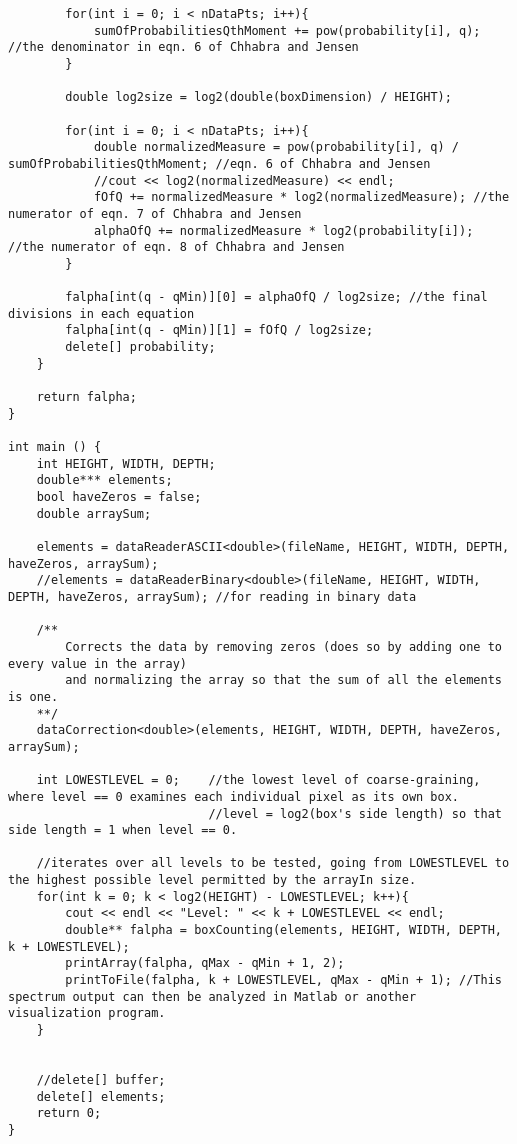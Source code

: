 \begin{lstlisting}
		for(int i = 0; i < nDataPts; i++){
			sumOfProbabilitiesQthMoment += pow(probability[i], q); //the denominator in eqn. 6 of Chhabra and Jensen
		}

		double log2size = log2(double(boxDimension) / HEIGHT);

		for(int i = 0; i < nDataPts; i++){
			double normalizedMeasure = pow(probability[i], q) / sumOfProbabilitiesQthMoment; //eqn. 6 of Chhabra and Jensen
			//cout << log2(normalizedMeasure) << endl;
			fOfQ += normalizedMeasure * log2(normalizedMeasure); //the numerator of eqn. 7 of Chhabra and Jensen
			alphaOfQ += normalizedMeasure * log2(probability[i]); //the numerator of eqn. 8 of Chhabra and Jensen
		}

		falpha[int(q - qMin)][0] = alphaOfQ / log2size; //the final divisions in each equation
		falpha[int(q - qMin)][1] = fOfQ / log2size;
		delete[] probability;
	}

	return falpha;
}

int main () {
    int HEIGHT, WIDTH, DEPTH;
    double*** elements;
    bool haveZeros = false;
    double arraySum;

    elements = dataReaderASCII<double>(fileName, HEIGHT, WIDTH, DEPTH, haveZeros, arraySum); 
    //elements = dataReaderBinary<double>(fileName, HEIGHT, WIDTH, DEPTH, haveZeros, arraySum); //for reading in binary data

    /**	
    	Corrects the data by removing zeros (does so by adding one to every value in the array)
    	and normalizing the array so that the sum of all the elements is one.
    **/
    dataCorrection<double>(elements, HEIGHT, WIDTH, DEPTH, haveZeros, arraySum);

	int LOWESTLEVEL = 0; 	//the lowest level of coarse-graining, where level == 0 examines each individual pixel as its own box.
							//level = log2(box's side length) so that side length = 1 when level == 0.

	//iterates over all levels to be tested, going from LOWESTLEVEL to the highest possible level permitted by the arrayIn size.
	for(int k = 0; k < log2(HEIGHT) - LOWESTLEVEL; k++){
		cout << endl << "Level: " << k + LOWESTLEVEL << endl;
		double** falpha = boxCounting(elements, HEIGHT, WIDTH, DEPTH, k + LOWESTLEVEL);
		printArray(falpha, qMax - qMin + 1, 2);
		printToFile(falpha, k + LOWESTLEVEL, qMax - qMin + 1); //This spectrum output can then be analyzed in Matlab or another visualization program.
	}

	
	//delete[] buffer;
	delete[] elements;
	return 0;
}


\end{lstlisting}